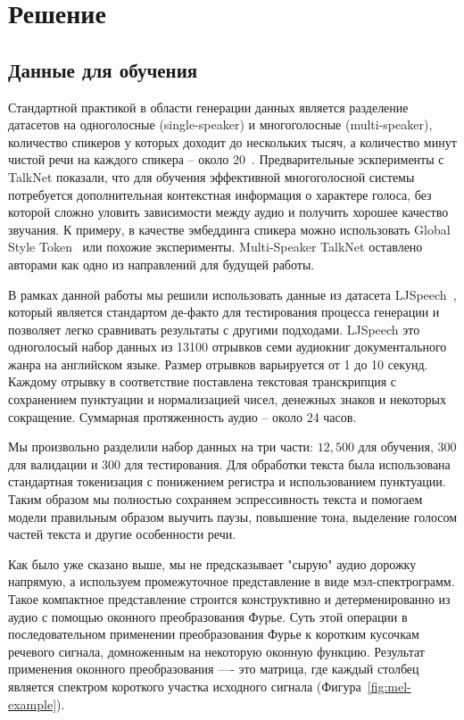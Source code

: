 \section{Решение}

\subsection{Данные для обучения}

Стандартной практикой в области генерации данных является разделение датасетов на одноголосные (single-speaker) и многоголосные (multi-speaker), количество спикеров у которых доходит до нескольких тысяч, а количество минут чистой речи на каждого спикера -- около $20$~\cite{libritts}. Предварительные эскперименты с TalkNet показали, что для обучения эффективной многоголосной системы потребуется дополнительная контекстная информация о характере голоса, без которой сложно уловить зависимости между аудио и получить хорошее качество звучания. К примеру, в качестве эмбеддинга спикера можно использовать Global Style Token~\cite{wang2018style} или похожие эксперименты. Multi-Speaker TalkNet оставлено авторами как одно из направлений для будущей работы.

В рамках данной работы мы решили использовать данные из датасета LJSpeech~\cite{ljspeech}, который является стандартом де-факто для тестирования процесса генерации и позволяет легко сравнивать результаты с другими подходами. LJSpeech это одноголосый набор данных из 13100 отрывков семи аудиокниг документального жанра на английском языке. Размер отрывков варьируется от 1 до 10 секунд. Каждому отрывку в соответствие поставлена текстовая транскрипция с сохранением пунктуации и нормализацией чисел, денежных знаков и некоторых сокращение. Суммарная протяженность аудио -- около 24 часов.

Мы произвольно разделили набор данных на три части: $12,500$ для обучения, 300 для валидации и 300 для тестирования. Для обработки текста была использована стандартная токенизация с понижением регистра и использованием пунктуации. Таким образом мы полностью сохраняем эспрессивность текста и помогаем модели правильным образом выучить паузы, повышение тона, выделение голосом частей текста и другие особенности речи.

Как было уже сказано выше, мы не предсказывает "сырую" аудио дорожку напрямую, а используем промежуточное представление в виде мэл-спектрограмм. Такое компактное представление строится конструктивно и детерменированно из аудио с помощью оконного преобразования Фурье. Суть этой операции в последовательном применении преобразования Фурье к коротким кусочкам речевого сигнала, домноженным на некоторую оконную функцию. Результат применения оконного преобразования —- это матрица, где каждый столбец является спектром короткого участка исходного сигнала (Фигура~\ref{fig:mel-example}).

